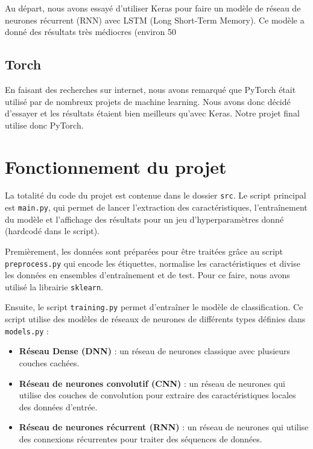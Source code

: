 \documentclass{article}
\begin{document}
Au départ, nous avons essayé d'utiliser Keras pour faire un modèle de réseau de neurones récurrent (RNN) avec LSTM (Long Short-Term Memory). Ce modèle a donné des résultats très médiocres (environ 50%

\subsection{Torch}

En faisant des recherches sur internet, nous avons remarqué que PyTorch était utilisé par de nombreux projets de machine learning. Nous avons donc décidé d'essayer et les résultats étaient bien meilleurs qu'avec Keras. Notre projet final utilise donc PyTorch.

\newpage
\section{Fonctionnement du projet}

La totalité du code du projet est contenue dans le dossier \texttt{src}. Le script principal est \texttt{main.py}, qui permet de lancer l'extraction des caractéristiques, l'entraînement du modèle et l'affichage des résultats pour un jeu d'hyperparamètres donné (hardcodé dans le script).

Premièrement, les données sont préparées pour être traitées grâce au script \texttt{preprocess.py} qui encode les étiquettes, normalise les caractéristiques et divise les données en ensembles d'entraînement et de test. Pour ce faire, nous avons utilisé la librairie \texttt{sklearn}.

Ensuite, le script \texttt{training.py} permet d'entraîner le modèle de classification. Ce script utilise des modèles de réseaux de neurones de différents types définies dans \texttt{models.py} :

\begin{itemize}
    \item \textbf{Réseau Dense (DNN)} : un réseau de neurones classique avec plusieurs couches cachées.
    \item \textbf{Réseau de neurones convolutif (CNN)} : un réseau de neurones qui utilise des couches de convolution pour extraire des caractéristiques locales des données d'entrée.
    \item \textbf{Réseau de neurones récurrent (RNN)} : un réseau de neurones qui utilise des connexions récurrentes pour traiter des séquences de données.
\end{itemize}
\end{document}
